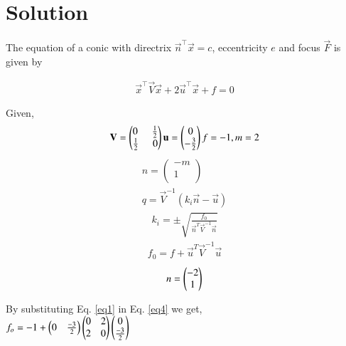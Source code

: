 \documentclass[journal,12pt,twocolumn]{IEEEtran}
\begin{document}
\section{Solution}
\begin{flushleft}
The equation of  a conic with directrix $\vec{n}^{\top}\vec{x} = c$, eccentricity $e$ and focus $\vec{F}$ is given by 
\end{flushleft}
\begin{align}
    \vec{x}^{\top}\vec{V}\vec{x}+2\vec{u}^{\top}\vec{x}+f=0
\end{align}    

\hspace{-6.5cm}Given, 
\begin{align}
	\vec{V}
	=\begin{pmatrix}
	0\hspace{0.5cm} \frac{1}{2}\\\frac{1}{2}\hspace{0.5cm} 0\\
	\end{pmatrix}
\vec{u} = \begin{pmatrix}
0 \\-\frac{3}{2}\\
\end{pmatrix}  f = -1, m=2
	\label{eq1}
\end{align}
\begin{align}
n=\begin{pmatrix}
-m \\ 1 \\
\end{pmatrix}    \\
q=\vec{V}^{-1}(k_i\vec{n}-\vec{u})    
\label{eq2}
\end{align}
\begin{align}
k_i=\pm \sqrt{\frac{f_0}{\vec{n}^T\vec{V}^{-1}\vec{n}}}     
\label{eq3}
\end{align}
\begin{align}
f_0=f+\vec{u}^T\vec{V}^{-1}\vec{u}     
\label{eq4}
\end{align}
\centering
\begin{align}
n=\begin{pmatrix}-2 \\ 1\end{pmatrix} 
\end{align}
\vspace{0.30cm}
\raggedright
By substituting Eq. \eqref{eq1} in Eq. \eqref{eq4} we get,\\
\centering
$f_o=-1+\begin{pmatrix}0 & \frac{-3}{2}\end{pmatrix}\begin{pmatrix}0 & 2 \\ 2 & 0\end{pmatrix}\begin{pmatrix}0 \\ \frac{-3}{2}\end{pmatrix}$\\
\end{document}

